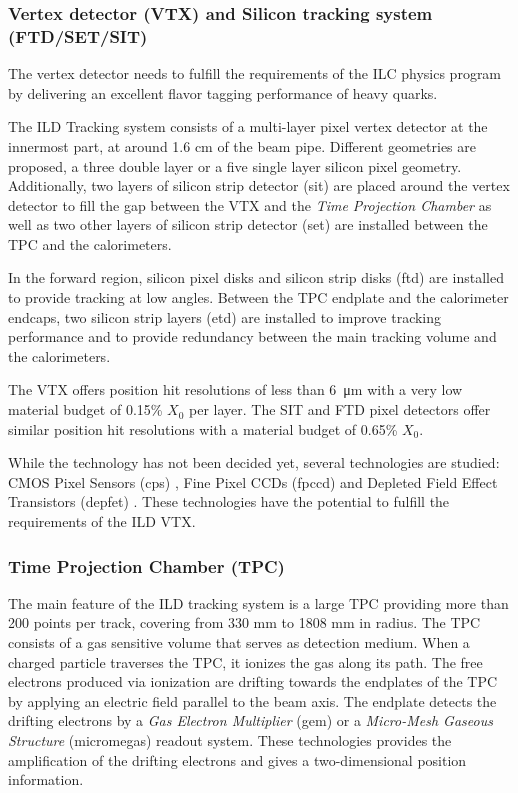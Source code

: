 \subsubsection{Vertex detector (VTX) and Silicon tracking system (FTD/SET/SIT)}

The vertex detector needs to fulfill the requirements of the ILC physics program by delivering an excellent flavor tagging performance of heavy quarks.

The ILD Tracking system consists of a multi-layer pixel vertex detector at the innermost part, at around 1.6 cm of the beam pipe. Different geometries are proposed, a three double layer or a five single layer silicon pixel geometry. Additionally, two layers of silicon strip detector (\acrshort{sit}) are placed around the vertex detector to fill the gap between the VTX and the \textit{Time Projection Chamber} as well as two other layers of silicon strip detector (\acrshort{set}) are installed between the TPC and the calorimeters.

In the forward region, silicon pixel disks and silicon strip disks (\acrshort{ftd}) are installed to provide tracking at low angles. Between the TPC endplate and the calorimeter endcaps, two silicon strip layers (\acrshort{etd}) are installed to improve tracking performance and to provide redundancy between the main tracking volume and the calorimeters.

The VTX offers position hit resolutions of less than \SI{6}{\micro\meter} \cite{ILC_TDR_Vol4} with a very low material budget of 0.15\% $X_0$ per layer. The SIT and FTD pixel detectors offer similar position hit resolutions with a material budget of 0.65\% $X_0$.

While the technology has not been decided yet, several technologies are studied: CMOS Pixel Sensors (\acrshort{cps}) \cite{Winter:2012ms}, Fine Pixel CCDs (\acrshort{fpccd}) \cite{Murai:2016taa} and Depleted Field Effect Transistors (\acrshort{depfet}) \cite{Boronat:2016cog}. These technologies have the potential to fulfill the requirements of the ILD VTX.

\subsubsection{Time Projection Chamber (TPC)}

The main feature of the ILD tracking system is a large TPC providing more than 200 points per track, covering from 330 mm to 1808 mm in radius. The TPC consists of a gas sensitive volume that serves as detection medium. When a charged particle traverses the TPC, it ionizes the gas along its path. The free electrons produced via ionization are drifting towards the endplates of the TPC by applying an electric field parallel to the beam axis. The endplate detects the drifting electrons by a \textit{Gas Electron Multiplier} (\acrshort{gem}) \cite{Sauli:1997qp} or a \textit{Micro-Mesh Gaseous Structure} (\acrshort{micromegas}) \cite{Giomataris:1995fq} readout system. These technologies provides the amplification of the drifting electrons and gives a two-dimensional position information.

